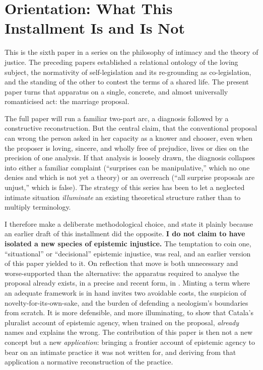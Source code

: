 \documentclass[11pt,a4paper]{article}
\begin{document}
\begin{abstract}
\vspace{0.6em}
\noindent\textbf{Keywords}\quad
epistemic injustice; epistemic agency; pluralist account; hermeneutical domination; epistemic empowerment; self-interpretation; transformative experience; marriage proposal; intimate justice; relational autonomy.
\end{abstract}

\tableofcontents
\clearpage

\section{Orientation: What This Installment Is and Is Not}\label{p06:sec:orientation}

This is the sixth paper in a series on the philosophy of intimacy and the theory of justice. The preceding papers established a relational ontology of the loving subject, the normativity of self-legislation and its re-grounding as co-legislation, and the standing of the other to contest the terms of a shared life. The present paper turns that apparatus on a single, concrete, and almost universally romanticised act: the marriage proposal.

The full paper will run a familiar two-part arc, a diagnosis followed by a constructive reconstruction. But the central claim, that the conventional proposal can wrong the person asked in her capacity as a knower and chooser, even when the proposer is loving, sincere, and wholly free of prejudice, lives or dies on the precision of one analysis. If that analysis is loosely drawn, the diagnosis collapses into either a familiar complaint (``surprises can be manipulative,'' which no one denies and which is not yet a theory) or an overreach (``all surprise proposals are unjust,'' which is false). The strategy of this series has been to let a neglected intimate situation \emph{illuminate} an existing theoretical structure rather than to multiply terminology.

I therefore make a deliberate methodological choice, and state it plainly because an earlier draft of this installment did the opposite. \textbf{I do not claim to have isolated a new species of epistemic injustice.} The temptation to coin one, ``situational'' or ``decisional'' epistemic injustice, was real, and an earlier version of this paper yielded to it. On reflection that move is both unnecessary and worse-supported than the alternative: the apparatus required to analyse the proposal already exists, in a precise and recent form, in \textcite{catala2025dynamics}. Minting a term where an adequate framework is in hand invites two avoidable costs, the suspicion of novelty-for-its-own-sake, and the burden of defending a neologism's boundaries from scratch. It is more defensible, and more illuminating, to show that Catala's pluralist account of epistemic agency, when trained on the proposal, \emph{already} names and explains the wrong. The contribution of this paper is then not a new concept but a new \emph{application}: bringing a frontier account of epistemic agency to bear on an intimate practice it was not written for, and deriving from that application a normative reconstruction of the practice.
\end{document}
